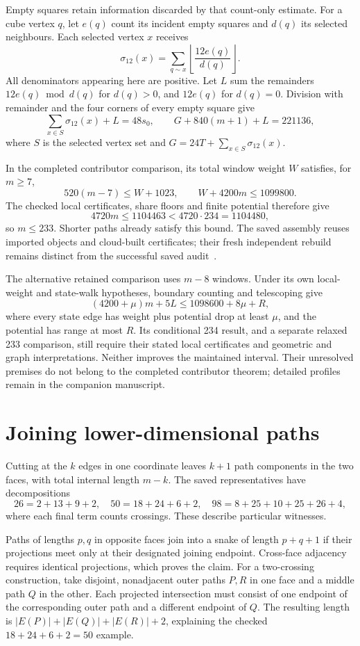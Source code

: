 \documentclass[11pt,a4paper]{article}
\begin{document}
Empty squares retain information discarded by that count-only estimate.
For a cube vertex $q$, let $e(q)$ count its incident empty squares and
$d(q)$ its selected neighbours. Each selected vertex $x$ receives
\[
\sigma_{12}(x)=\sum_{q\sim x}
 \left\lfloor\frac{12e(q)}{d(q)}\right\rfloor.
\]
All denominators appearing here are positive. Let $L$ sum the remainders
$12e(q)\bmod d(q)$ for $d(q)>0$, and $12e(q)$ for $d(q)=0$.
Division with remainder and the four corners of every empty square give
\[
\sum_{x\in S}\sigma_{12}(x)+L=48s_0,\qquad
G+840(m+1)+L=221136,
\]
where $S$ is the selected vertex set and $G=24T+\sum_{x\in S}\sigma_{12}(x)$.

In the completed contributor comparison, its total window weight $W$
satisfies, for $m\ge7$,
\[
520(m-7)\le W+1023,\qquad W+4200m\le1099800.
\]
The checked local certificates, share floors and finite potential therefore give
\[
4720m\le1104463<4720\cdot234=1104480,
\]
so $m\le233$. Shorter paths already satisfy this bound. The saved assembly
reuses imported objects and cloud-built certificates; their fresh independent
rebuild remains distinct from the successful saved audit~\cite{bound233archive}.

The alternative retained comparison uses $m-8$ windows. Under its own
local-weight and state-walk hypotheses, boundary counting and telescoping give
\[
(4200+\mu)m+5L\le1098600+8\mu+R,
\]
where every state edge has weight plus potential drop at least $\mu$,
and the potential has range at most $R$. Its conditional 234 result,
and a separate relaxed 233 comparison, still require their stated local
certificates and geometric and graph interpretations. Neither improves the
maintained interval. Their unresolved premises do not belong to the completed
contributor theorem; detailed profiles remain in the companion manuscript.

\section{Joining lower-dimensional paths}
Cutting at the $k$ edges in one coordinate leaves $k+1$ path components
in the two faces, with total internal length $m-k$.
The saved representatives have decompositions
\[
26=2+13+9+2,\quad 50=18+24+6+2,\quad
98=8+25+10+25+26+4,
\]
where each final term counts crossings. These describe particular witnesses.

Paths of lengths $p,q$ in opposite faces join into a snake of length
$p+q+1$ if their projections meet only at their designated joining endpoint.
Cross-face adjacency requires identical projections, which proves the claim.
For a two-crossing construction, take disjoint, nonadjacent outer paths
$P,R$ in one face and a middle path $Q$ in the other. Each projected
intersection must consist of one endpoint of the corresponding outer path
and a different endpoint of $Q$. The resulting length is
$|E(P)|+|E(Q)|+|E(R)|+2$, explaining the checked $18+24+6+2=50$ example.
\end{document}
